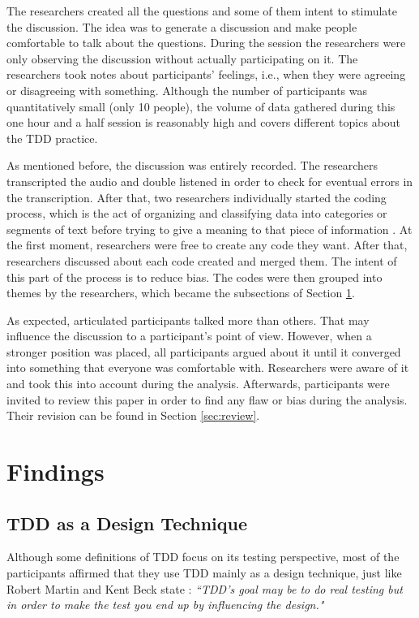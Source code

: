 The researchers created all the questions and some of them intent to stimulate
the discussion. The idea was to generate a discussion and make people
comfortable to talk about the questions.
During the session the researchers were only observing the discussion without
actually participating on it.
The researchers took notes about participants' feelings, i.e., when they
were agreeing or disagreeing with something.
Although the number of participants was quantitatively small (only 10 people),
the volume of data gathered during this one hour and a half session is
reasonably high and covers different topics about the TDD practice.

As mentioned before, the discussion was entirely recorded. The researchers
transcripted the audio and double listened in order to check for eventual errors
in the transcription. After that, two researchers individually started the
coding process, which is the act of organizing and classifying data into
categories or segments of text before trying to give a meaning to that piece of
information \cite{rossman}. At the first moment, researchers were free to
create any code they want. After that, researchers discussed about each code
created and merged them. The intent of this part of the process is to reduce
bias.
The codes were then grouped into themes by the researchers, which became the
subsections of Section \ref{sec:findings}.

As expected, articulated participants talked more than others. That may
influence the discussion to a participant's point of view. However, when a
stronger position was placed, all participants argued about it until it
converged into something that everyone was comfortable with. Researchers were
aware of it and took this into account during the analysis.
Afterwards, participants were invited to review this paper in order to find any
flaw or bias during the analysis. Their revision can be found in Section
\ref{sec:review}.

\section{Findings}
\label{sec:findings}

\subsection{TDD as a Design Technique}

Although some definitions of TDD focus on its testing perspective, most of the
participants affirmed that they use TDD mainly as a design technique, just like
Robert Martin \cite{bob-martin} and Kent Beck state \cite{aim-fire}
\cite{tdd-by-example}: \textit{``TDD's goal may be to do real testing but in
order to make the test you end up by influencing the design."}

